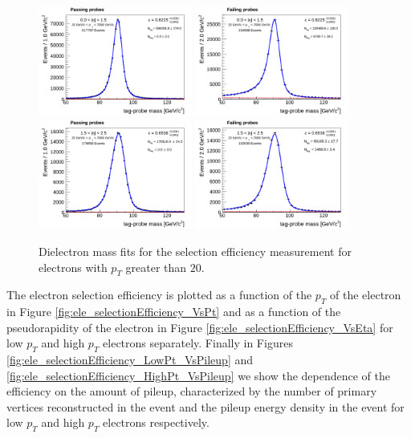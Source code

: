 \begin{figure}[!htbp]
\begin{center}
\includegraphics[width=0.45\textwidth]{figures/ElectronSelectionEffMassFitPass_EtaPtBin4.pdf}
\includegraphics[width=0.45\textwidth]{figures/ElectronSelectionEffMassFitFail_EtaPtBin4.pdf}
\includegraphics[width=0.45\textwidth]{figures/ElectronSelectionEffMassFitPass_EtaPtBin5.pdf}
\includegraphics[width=0.45\textwidth]{figures/ElectronSelectionEffMassFitFail_EtaPtBin5.pdf}
\caption{Dielectron mass fits for the selection efficiency measurement for electrons with
$p_{T}$ greater than $20$\GeV.}
\label{fig:ele_selectionEfficiency_massfits_highPt}
\end{center}
\end{figure}


The electron selection efficiency is plotted as a function of the $p_{T}$ of the electron in Figure 
\ref{fig:ele_selectionEfficiency_VsPt} and as a function of the pseudorapidity of the electron
in Figure \ref{fig:ele_selectionEfficiency_VsEta} for low $p_{T}$ and high $p_{T}$ electrons separately. Finally in Figures
\ref{fig:ele_selectionEfficiency_LowPt_VsPileup} and \ref{fig:ele_selectionEfficiency_HighPt_VsPileup}
we show the dependence of the efficiency on the amount of pileup, characterized by the
number of primary vertices reconstructed in the event and the pileup energy density 
in the event for low $p_{T}$ and high $p_{T}$ electrons respectively.

